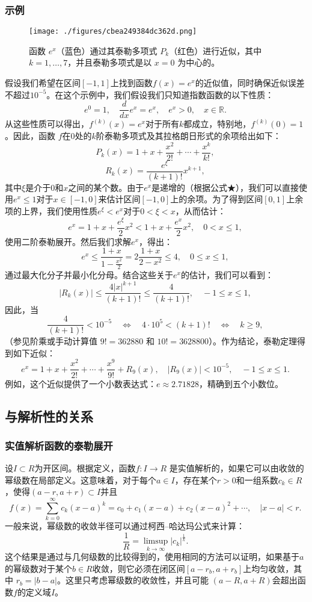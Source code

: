 \subsubsection{示例}
\begin{figure}[ht]
\centering
\texttt{[image: ./figures/cbea249384dc362d.png]}
\caption{函数 \( e^x \)（蓝色）通过其泰勒多项式 \( P_k \)（红色）进行近似，其中 \( k = 1, \ldots, 7 \)，并且泰勒多项式是以 \( x = 0 \) 为中心的。} \label{fig_TLGS_5}
\end{figure}
假设我们希望在区间\( [-1, 1] \)上找到函数\( f(x) = e^x \)的近似值，同时确保近似误差不超过\( 10^{-5} \)。在这个示例中，我们假设我们只知道指数函数的以下性质：
\[
e^0 = 1, \quad \frac{d}{dx} e^x = e^x, \quad e^x > 0, \quad x \in \mathbb{R}.~
\]
从这些性质可以得出，\( f^{(k)}(x) = e^x \)对于所有\( k \)都成立，特别地，\( f^{(k)}(0) = 1 \)。因此，函数 \( f \)在\( 0 \)处的\( k \)阶泰勒多项式及其拉格朗日形式的余项给出如下：
\[
P_k(x) = 1 + x + \frac{x^2}{2!} + \cdots + \frac{x^k}{k!},~
\]
\[
R_k(x) = \frac{e^\xi}{(k+1)!} x^{k+1},~
\]
其中\( \xi \)是介于\( 0 \)和\( x \)之间的某个数。由于\( e^x \)是递增的（根据公式★），我们可以直接使用\( e^x \leq 1 \)对于\( x \in [-1, 0] \)来估计区间\( [-1, 0] \)上的余项。为了得到区间\( [0, 1] \)上余项的上界，我们使用性质\( e^\xi < e^x \)对于\( 0 < \xi < x \)，从而估计：
\[
e^x = 1 + x + \frac{e^\xi}{2} x^2 < 1 + x + \frac{e^x}{2} x^2, \quad 0 < x \leq 1,~
\]
使用二阶泰勒展开。然后我们求解\( e^x \)，得出：
\[
e^x \leq \frac{1 + x}{1 - \frac{x^2}{2}} = 2 \frac{1 + x}{2 - x^2} \leq 4, \quad 0 \leq x \leq 1,~
\]
通过最大化分子并最小化分母。结合这些关于\( e^x \)的估计，我们可以看到：
\[
|R_k(x)| \leq \frac{4 |x|^{k+1}}{(k+1)!} \leq \frac{4}{(k+1)!}, \quad -1 \leq x \leq 1,~
\]
因此，当
\[
\frac{4}{(k+1)!} < 10^{-5} \quad \Longleftrightarrow \quad 4 \cdot 10^5 < (k+1)! \quad \Longleftrightarrow \quad k \geq 9,~
\]
（参见阶乘或手动计算值 \( 9! = 362880 \) 和 \( 10! = 3628800 \)）。作为结论，泰勒定理得到如下近似：
\[
e^x = 1 + x + \frac{x^2}{2!} + \cdots + \frac{x^9}{9!} + R_9(x), \quad |R_9(x)| < 10^{-5}, \quad -1 \leq x \leq 1.~
\]
例如，这个近似提供了一个小数表达式：\(e \approx 2.71828\)，精确到五个小数位。
\subsection{与解析性的关系}  
\subsubsection{实值解析函数的泰勒展开}  
设\( I \subset R \)为开区间。根据定义，函数\( f : I \to R \) 是实值解析的，如果它可以由收敛的幂级数在局部定义。这意味着，对于每个\( a \in I \)，存在某个\( r > 0 \)和一组系数\( c_k \in R\)，使得\( (a - r, a + r) \subset I \)并且
\[
f(x) = \sum_{k=0}^{\infty} c_k (x - a)^k = c_0 + c_1 (x - a) + c_2 (x - a)^2 + \cdots, \quad |x - a| < r.~
\]
一般来说，幂级数的收敛半径可以通过柯西–哈达玛公式来计算：
\[
\frac{1}{R} = \limsup_{k \to \infty} |c_k|^{\frac{1}{k}}.~
\]
这个结果是通过与几何级数的比较得到的，使用相同的方法可以证明，如果基于\( a \)的幂级数对于某个\( b \in R\)收敛，则它必须在闭区间\( [a - r_b, a + r_b] \)上均匀收敛，其中 \( r_b = |b - a| \)。这里只考虑幂级数的收敛性，并且可能 \( (a - R, a + R) \)会超出函数\( f \)的定义域\( I \)。


